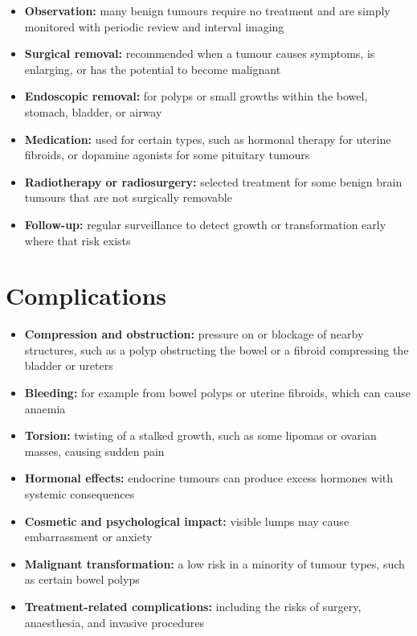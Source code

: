 \begin{itemize}
    \item \textbf{Observation:} many benign tumours require no treatment and are simply monitored with periodic review and interval imaging
    \item \textbf{Surgical removal:} recommended when a tumour causes symptoms, is enlarging, or has the potential to become malignant
    \item \textbf{Endoscopic removal:} for polyps or small growths within the bowel, stomach, bladder, or airway
    \item \textbf{Medication:} used for certain types, such as hormonal therapy for uterine fibroids, or dopamine agonists for some pituitary tumours
    \item \textbf{Radiotherapy or radiosurgery:} selected treatment for some benign brain tumours that are not surgically removable
    \item \textbf{Follow-up:} regular surveillance to detect growth or transformation early where that risk exists
\end{itemize}

\section*{Complications}
\begin{itemize}
    \item \textbf{Compression and obstruction:} pressure on or blockage of nearby structures, such as a polyp obstructing the bowel or a fibroid compressing the bladder or ureters
    \item \textbf{Bleeding:} for example from bowel polyps or uterine fibroids, which can cause anaemia
    \item \textbf{Torsion:} twisting of a stalked growth, such as some lipomas or ovarian masses, causing sudden pain
    \item \textbf{Hormonal effects:} endocrine tumours can produce excess hormones with systemic consequences
    \item \textbf{Cosmetic and psychological impact:} visible lumps may cause embarrassment or anxiety
    \item \textbf{Malignant transformation:} a low risk in a minority of tumour types, such as certain bowel polyps
    \item \textbf{Treatment-related complications:} including the risks of surgery, anaesthesia, and invasive procedures
\end{itemize}

